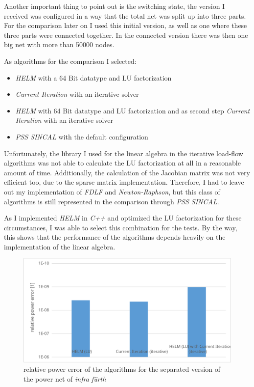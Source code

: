 Another important thing to point out is the switching state, the version I received was configured in a way that the total net was split up into three parts. For the comparison later on I used this initial version, as well as one where these three parts were connected together. In the connected version there was then one big net with more than 50000 nodes.

As algorithms for the comparison I selected:
\begin{itemize}
	\item \emph{HELM} with a 64 Bit datatype and LU factorization
	\item \emph{Current Iteration} with an iterative solver
	\item \emph{HELM} with 64 Bit datatype and LU factorization and as second step \emph{Current Iteration} with an iterative solver
	\item \emph{PSS SINCAL} with the default configuration
\end{itemize}
Unfortunately, the library I used for the linear algebra in the iterative load-flow algorithms was not able to calculate the LU factorization at all in a reasonable amount of time. Additionally, the calculation of the Jacobian matrix was not very efficient too, due to the sparse matrix implementation. Therefore, I had to leave out my implementation of \emph{FDLF} and \emph{Newton-Raphson}, but this class of algorithms is still represented in the comparison through \emph{PSS SINCAL}.

As I implemented \emph{HELM} in \emph{C++} and optimized the LU factorization for these circumstances, I was able to select this combination for the tests. By the way, this shows that the performance of the algorithms depends heavily on the implementation of the linear algebra.

\begin{figure}
	\centering
	\includegraphics[scale=0.7]{figures/big_net_separate_relative_power_error}
	\caption[Comparison, \emph{infra fürth}, separate, error]{relative power error of the algorithms for the separated version of the power net of \emph{infra fürth}}
	\label{fig:big_net_separate_relative_power_error}
\end{figure}

